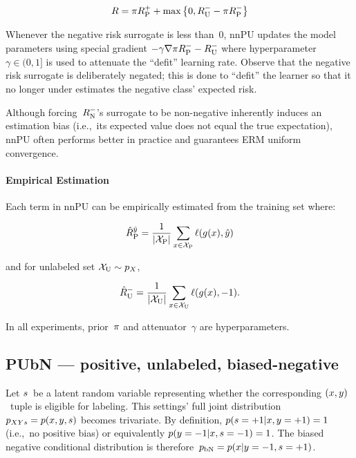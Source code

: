 \begin{equation}\label{eq:Risk:nnPU}
  R = \pi R_{\textnormal{P}}^{{+}} + \max\left\{0, R_{\textnormal{U}}^{{-}} - \pi R_{\textnormal{P}}^{{-}} \right\}
\end{equation}

Whenever the negative risk surrogate is less than~0, nnPU updates the model parameters using special gradient ${-\gamma \nabla \pi R_{\textnormal{P}}^{{-}} - R_{\textnormal{U}}^{{-}}}$ where hyperparameter~${\gamma \in (0,1]}$ is used to attenuate the ``defit'' learning rate.  Observe that the negative risk surrogate is deliberately negated; this is done to ``defit'' the learner so that it no longer under estimates the negative class' expected risk.

Although forcing~$R_{\textnormal{N}}^{{-}}$'s surrogate to be non-negative inherently induces an estimation bias (i.e.,~its expected value does not equal the true expectation), nnPU often performs better in practice and guarantees ERM uniform convergence.

\paragraph{Empirical Estimation} Each term in nnPU can be empirically estimated from the training set where:

\begin{equation}\label{eq:EmpRisk:Pos}
  \hat{R}_{\textnormal{P}}^{\hat{y}} = \frac{1}{\lvert\mathcal{X}_{\textnormal{P}}\rvert} \sum_{x \in \mathcal{X}_{\textnormal{P}}} \ell\mathopen{}\left(g\mathopen{}\left(x\right)\mathclose{},\hat{y}\right)\mathclose{}
\end{equation}

\noindent
and for unlabeled set ${\mathcal{X}_{\textnormal{U}} \sim p_{X}}$,

\begin{equation}
  \hat{R}_{\textnormal{U}}^{-} = \frac{1}{\lvert\mathcal{X}_{\textnormal{U}}\rvert} \sum_{x \in \mathcal{X}_{\textnormal{U}}} \ell\mathopen{}\left(g\mathopen{}\left(x\right)\mathclose{},{-}1\right)\mathclose{} \text{.}
\end{equation}

\noindent
In all experiments, prior~$\pi$ and attenuator~$\gamma$ are hyperparameters.

\subsection{PUbN --- positive, unlabeled, biased-negative}

Let $s$~be a latent random variable representing whether the corresponding ${(x,y)}$~tuple is eligible for labeling.  This settings' full joint distribution~${p_{XYs} = p(x, y, s)}$ becomes trivariate.  By definition, ${p(s = {+}1 \vert x, y = {+}1) = 1}$ (i.e.,~no positive bias) or equivalently ${p(y = {-}1 \vert x, s = {-}1) = 1}$.  The biased negative conditional distribution is therefore~${p_{\textnormal{bN}} = p(x \vert y = {-}1, s = {+}1)}$.


